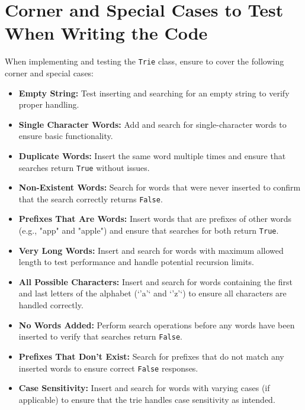 \section*{Corner and Special Cases to Test When Writing the Code}

When implementing and testing the \texttt{Trie} class, ensure to cover the following corner and special cases:

\begin{itemize}
    \item \textbf{Empty String:}  
    Test inserting and searching for an empty string to verify proper handling.
    
    \item \textbf{Single Character Words:}  
    Add and search for single-character words to ensure basic functionality.
    
    \item \textbf{Duplicate Words:}  
    Insert the same word multiple times and ensure that searches return \texttt{True} without issues.
    
    \item \textbf{Non-Existent Words:}  
    Search for words that were never inserted to confirm that the search correctly returns \texttt{False}.
    
    \item \textbf{Prefixes That Are Words:}  
    Insert words that are prefixes of other words (e.g., "app" and "apple") and ensure that searches for both return \texttt{True}.
    
    \item \textbf{Very Long Words:}  
    Insert and search for words with maximum allowed length to test performance and handle potential recursion limits.
    
    \item \textbf{All Possible Characters:}  
    Insert and search for words containing the first and last letters of the alphabet (`'a'` and `'z'`) to ensure all characters are handled correctly.
    
    \item \textbf{No Words Added:}  
    Perform search operations before any words have been inserted to verify that searches return \texttt{False}.
    
    \item \textbf{Prefixes That Don't Exist:}  
    Search for prefixes that do not match any inserted words to ensure correct \texttt{False} responses.
    
    \item \textbf{Case Sensitivity:}  
    Insert and search for words with varying cases (if applicable) to ensure that the trie handles case sensitivity as intended.
\end{itemize}

